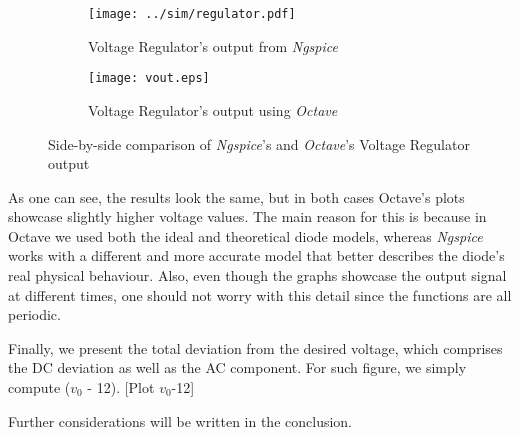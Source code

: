 \begin{figure}[H]
\centering
\begin{subfigure}{.5\textwidth}
  \centering
  \texttt{[image: ../sim/regulator.pdf]}
  \caption{Voltage Regulator's output from \textit{Ngspice}}
  \label{fig:RegulatorNGSPICE}
\end{subfigure}%
\begin{subfigure}{.5\textwidth}
  \centering
  \texttt{[image: vout.eps]}
  \caption{Voltage Regulator's output using \textit{Octave}}
  \label{fig:RegulatorOCTAVE}
\end{subfigure}
\caption{Side-by-side comparison of \textit{Ngspice}'s and \textit{Octave}'s Voltage Regulator output}
\label{fig:RegulatorComparacao}
\end{figure}

As one can see, the results look the same, but in both cases Octave's plots showcase slightly higher voltage values. The main reason for this is because in Octave we used both the ideal and theoretical diode models, whereas \textit{Ngspice} works with a different and
more accurate model that better describes the diode's real physical behaviour. Also, even though the graphs showcase the output signal at different times, one should not worry with this detail since the functions are all periodic.

Finally, we present the total deviation from the desired voltage, which comprises the DC deviation as well as the AC component. For such figure, we simply compute ($v_0$ - 12).
[Plot $v_0$-12]

Further considerations will be written in the conclusion.
